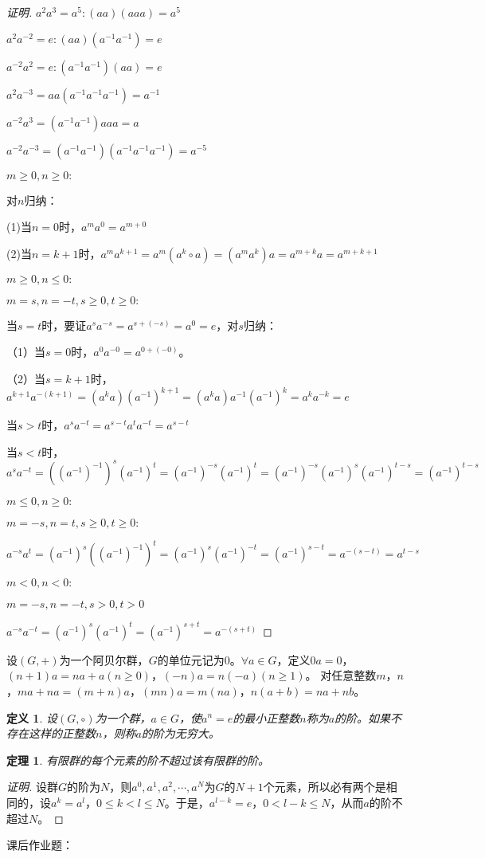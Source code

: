 \documentclass{article}
\newtheorem{Def}{定义}
\newtheorem{Thm}{定理}
\begin{document}
\begin{CJK*}{UTF8}{gbsn}
\begin{proof}[证明]
$a^2a^3=a^5:(aa)(aaa)=a^5$

$a^2a^{-2}=e:(aa)(a^{-1}a^{-1})=e$

$a^{-2}a^{2}=e:(a^{-1}a^{-1})(aa)=e$

$a^2a^{-3}=aa(a^{-1}a^{-1}a^{-1})=a^{-1}$

$a^{-2}a^3=(a^{-1}a^{-1})aaa=a$



$a^{-2}a^{-3}=(a^{-1}a^{-1})(a^{-1}a^{-1}a^{-1})=a^{-5}$

$m\geq 0,n\geq 0:$

对$n$归纳：

(1)当$n=0$时，$a^ma^0=a^{m+0}$

(2)当$n=k+1$时，$a^{m}a^{k+1}=a^m(a^k\circ a)=(a^ma^k)a=a^{m+k}a=a^{m+k+1}$

$m\geq 0,n \leq 0:$


$m=s,n=-t, s\geq 0,t\geq 0:$

当$s=t$时，要证$a^{s}a^{-s}=a^{s+(-s)}=a^0=e$，对$s$归纳：

（1）当$s=0$时，$a^0a^{-0}=a^{0+(-0)}$。

（2）当$s=k+1$时，$a^{k+1}a^{-(k+1)}=(a^ka)(a^{-1})^{k+1}=(a^ka)a^{-1}(a^{-1})^k=a^ka^{-k}=e$

当$s>t$时，$a^sa^{-t}=a^{s-t}a^{t}a^{-t}=a^{s-t}$

当$s<t$时，$a^sa^{-t}=((a^{-1})^{-1})^s(a^{-1})^t=(a^{-1})^{-s}(a^{-1})^t=(a^{-1})^{-s}(a^{-1})^{s}(a^{-1})^{t-s}=(a^{-1})^{t-s}$

$m\leq 0, n\geq 0:$

$m=-s,n=t,s\geq 0, t\geq 0:$

$a^{-s}a^t=(a^{-1})^s((a^{-1})^{-1})^t=(a^{-1})^s(a^{-1})^{-t}=(a^{-1})^{s-t}=a^{-(s-t)}=a^{t-s}$

$m<0, n<0:$

$m=-s,n=-t, s>0,t>0$

$a^{-s}a^{-t}=(a^{-1})^s(a^{-1})^t=(a^{-1})^{s+t}=a^{-(s+t)}$
\end{proof}
设$(G,+)$为一个阿贝尔群，$G$的单位元记为$0$。$\forall a\in G$，定义$0a=0$，$(n+1)a=na+a$$(n\geq 0)$，$(-n)a=n(-a)$$(n\geq 1)$。
对任意整数$m$，$n$，$ma+na=(m+n)a$，$(mn)a=m(na)$，$n(a+b)=na+nb$。
\begin{Def}
  设$(G,\circ)$为一个群，$a\in G$，使$a^n=e$的最小正整数$n$称为$a$的阶。如果不存在这样的正整数$n$，则称$a$的阶为无穷大。
\end{Def}
\begin{Thm}
  有限群的每个元素的阶不超过该有限群的阶。
\end{Thm}
\begin{proof}[证明]
  设群$G$的阶为$N$，则$a^0,a^1,a^2,\cdots,a^N$为$G$的$N+1$个元素，所以必有两个是相同的，设$a^k=a^l$，$0\leq k<l\leq N$。于是，$a^{l-k}=e$，$0<l-k\leq N$，从而$a$的阶不超过$N$。
\end{proof}
课后作业题：


\end{CJK*}
\end{document}
